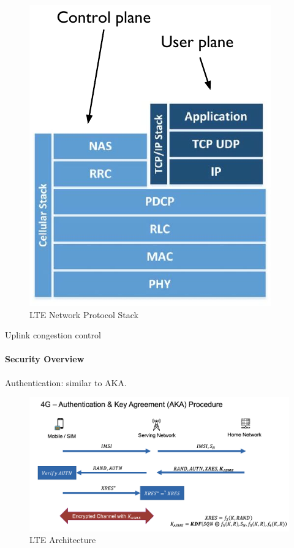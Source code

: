 \begin{figure}[h]
	\centering
	\includegraphics[scale=0.5]{images/10-4g-network-stack.png}
	\caption{LTE Network Protocol Stack}%
	\label{fig:4g-network-stack}
\end{figure}

Uplink congestion control

\paragraph{Security Overview}
Authentication: similar to AKA.

\begin{figure}[h]
	\centering
	\includegraphics[scale=0.5]{images/10-4g-aka.png}
	\caption{LTE Architecture}%
	\label{fig:4g-aka}
\end{figure}

